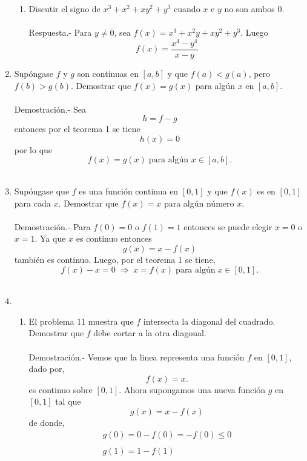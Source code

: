 \begin{enumerate}[\bfseries 1.]
\begin{enumerate}[\bfseries (a)]
	\item Discutir el signo de $x^3+x^2+xy^2+y^3$ cuando $x$ e $y$ no son ambos $0$.\\\\
	    Respuesta.-\; Para $y\neq 0$, sea $f(x)=x^3+x^2y+xy^2+y^3$. Luego
	    $$f(x)=\dfrac{x^4-y^4}{x-y}$$

    \end{enumerate}

\item Supóngase $f$ y $g$ son continuas en $[a,b]$ y que $f(a)<g(a)$, pero $f(b)>g(b)$. Demostrar que $f(x)=g(x)$ para algún $x$ en $[a,b]$.\\\\
    Demostración.-\; Sea $$h=f-g$$
    entonces por el teorema 1 se tiene $$h(x)=0$$
    por lo que $$f(x)=g(x)\; \mbox{para algún }x \in [a,b].$$\\

\item Supóngase que $f$ es una función continua en $[0,1]$ y que $f(x)$ es en $[0,1]$ para cada $x$. Demostrar que $f(x)=x$ para algún número $x$.\\\\
    Demostración.-\; Para $f(0)=0$ o $f(1)=1$ entonces se puede elegir $x=0$ o $x=1$. Ya que $x$ es continuo entonces $$g(x)=x-f(x)$$ también es continuo. Luego, por el teorema 1 se tiene,
    $$f(x) - x = 0 \; \Longrightarrow \; x=f(x) \; \mbox{para algún}\; x \in [0,1].$$\\

\item  
    \begin{enumerate}[\bfseries (a)]

	\item El problema 11 muestra que $f$ intersecta la diagonal del cuadrado. Demostrar que $f$ debe cortar a la otra diagonal.\\\\
	    Demostración.-\; Vemos que la linea representa una función $f$ en $[0,1]$, dado por,
	    $$f(x)=x.$$
	    es continuo sobre $[0,1]$. Ahora supongamos una nueva función $g$ en $[0,1]$ tal que
	    $$g(x)=x-f(x)$$
	    de donde,
	    $$\begin{array}{l}
		g(0)=0-f(0)=-f(0)\leq 0\\\\
		g(1)=1-f(1)\\
	    \end{array}$$


\end{enumerate}
\end{enumerate}
